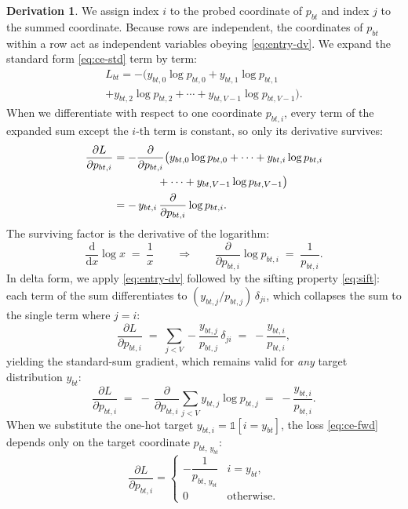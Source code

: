 \documentclass[letterpaper, 10 pt, conference]{ieeeconf}
\newcommand{\pdv}[2]{\frac{\partial #1}{\partial #2}}
\newcommand{\dv}[2]{\frac{\mathrm{d} #1}{\mathrm{d} #2}}
\newcommand{\dL}[1]{\pdv{L}{#1}}
\newcommand{\ind}[1]{\mathbb{1}\!\left[#1\right]}
\newcommand{\kron}[2]{\delta_{#1 #2}}
\theoremstyle{definition}
\newtheorem*{derivation}{Derivation}
\begin{document}
\begin{derivation}
  We assign index $i$ to the probed coordinate of $p_{bt}$ and index $j$ to the summed coordinate. Because rows are independent, the coordinates of $p_{bt}$ within a row act as independent variables obeying \eqref{eq:entry-dv}. We expand the standard form \eqref{eq:ce-std} term by term:
  \begin{multline}
    L_{bt} = -\bigl(
    y_{bt,0}\log p_{bt,0}
    + y_{bt,1}\log p_{bt,1} \\
    + y_{bt,2}\log p_{bt,2}
    + \cdots
    + y_{bt,V-1}\log p_{bt,V-1}
    \bigr).
    \label{eq:ce-std-expanded}
  \end{multline}
  When we differentiate with respect to one coordinate $p_{bt,i}$, every term of the expanded sum except the $i$-th term is constant, so only its derivative survives:
  \begin{align}
    \dL{p_{bt,i}}
     & = -\pdv{}{p_{bt,i}}\bigl(
    y_{bt,0}\log p_{bt,0} + \cdots
    + y_{bt,i}\log p_{bt,i} \notag                   \\
     & \qquad\qquad + \cdots
    + y_{bt,V-1}\log p_{bt,V-1}
    \bigr) \notag                                    \\
     & = -\,y_{bt,i}\,\pdv{}{p_{bt,i}}\log p_{bt,i}.
    \label{eq:ce-surviving}
  \end{align}
  The surviving factor is the derivative of the logarithm:
  \begin{equation}
    \dv{}{x}\log x \;=\; \frac{1}{x}
    \qquad\Longrightarrow\qquad
    \pdv{}{p_{bt,i}}\log p_{bt,i} \;=\; \frac{1}{p_{bt,i}}.
    \label{eq:dlog}
  \end{equation}
  In delta form, we apply \eqref{eq:entry-dv} followed by the sifting property \eqref{eq:sift}: each term of the sum differentiates to $(y_{bt,j}/p_{bt,j})\,\kron{j}{i}$, which collapses the sum to the single term where $j = i$:
  \begin{equation}
    \dL{p_{bt,i}}
    \;=\;
    \sum_{j<V} -\frac{y_{bt,j}}{p_{bt,j}}\,\kron{j}{i}
    \;=\;
    -\frac{y_{bt,i}}{p_{bt,i}},
    \label{eq:ce-delta-form}
  \end{equation}
  yielding the standard-sum gradient, which remains valid for \emph{any} target distribution $y_{bt}$:
  \begin{equation}
    \dL{p_{bt,i}}
    \;=\;
    -\,\pdv{}{p_{bt,i}} \sum_{j<V} y_{bt,j} \log p_{bt,j}
    \;=\;
    -\frac{y_{bt,i}}{p_{bt,i}}.
    \label{eq:ce-std-bwd}
  \end{equation}
  When we substitute the one-hot target $y_{bt,i} = \ind{i = y_{bt}}$, the loss \eqref{eq:ce-fwd} depends only on the target coordinate $p_{bt,\,y_{bt}}$:
  \begin{equation}
    \dL{p_{bt,i}} =
    \begin{cases}
      -\dfrac{1}{p_{bt,\,y_{bt}}} & i = y_{bt},       \\
      0                           & \text{otherwise}.
    \end{cases}
  \end{equation}
\end{derivation}
\end{document}
